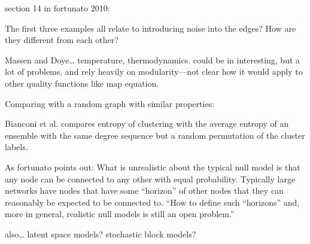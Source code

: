 section 14 in fortunato 2010:

The first three examples all relate to introducing noise into the edges?
How are they different from each other?

Massen and Doye\ldots{} temperature, thermodynamics. could be in
interesting, but a lot of problems, and rely heavily on modularity---not
clear how it would apply to other quality functions like map equation.

Comparing with a random graph with similar properties:

Bianconi et al. compares entropy of clustering with the average entropy
of an ensemble with the same degree sequence but a random permutation of
the cluster labels.

As fortunato points out: What is unrealistic about the typical null
model is that any node can be connected to any other with equal
probability. Typically large networks have nodes that have some
``horizon'' of other nodes that they can reasonably be expected to be
connected to. ``How to define such ``horizons'' and, more in general,
realistic null models is still an open problem.''

also\ldots{} latent space models? stochastic block models?
